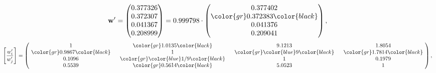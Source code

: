 \begin{example}
\begin{equation*}
\mathbf{w}^{\prime} =
\begin{pmatrix}
0.377326\\
0.372307\\
0.041367\\
0.208999
\end{pmatrix} =
0.999798\cdot
\begin{pmatrix}
0.377402\\
\color{gr} 0.372383\color{black} \\
0.041376\\
0.209041
\end{pmatrix},
\end{equation*}
\begin{equation*}
\left[ \frac{{w}^{\prime}_i}{{w}^{\prime}_j} \right] =
\begin{pmatrix}
$\,\,$ 1 $\,\,$ & $\,\,$\color{gr} 1.0135\color{black} $\,\,$ & $\,\,$9.1213$\,\,$ & $\,\,$1.8054$\,\,$ \\
$\,\,$\color{gr} 0.9867\color{black} $\,\,$ & $\,\,$ 1 $\,\,$ & $\,\,$\color{gr} \color{blue} 9\color{black} $\,\,$ & $\,\,$\color{gr} 1.7814\color{black}   $\,\,$ \\
$\,\,$0.1096$\,\,$ & $\,\,$\color{gr} \color{blue}  1/9\color{black} $\,\,$ & $\,\,$ 1 $\,\,$ & $\,\,$0.1979 $\,\,$ \\
$\,\,$0.5539$\,\,$ & $\,\,$\color{gr} 0.5614\color{black} $\,\,$ & $\,\,$5.0523$\,\,$ & $\,\,$ 1  $\,\,$ \\
\end{pmatrix},
\end{equation*}
\end{example}
\newpage
